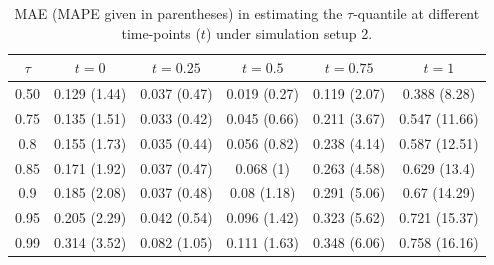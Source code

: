 \documentclass[aos]{imsart}
\theoremstyle{plain}
\theoremstyle{remark}
\begin{document}
\begin{table}[ht]
\centering
\caption{MAE (MAPE given in parentheses) in estimating the $\tau$-quantile at different time-points ($t$) under simulation setup 2.}
\label{tab:sim-S2-MAE}
\begin{tabular}{cccccc}
  \toprule
  $\tau$ & $t = 0$ & $t = 0.25$ & $t = 0.5$ & $t = 0.75$ & $t = 1$ \\ 
  \midrule
  0.50 &  0.129 (1.44) & 0.037 (0.47) & 0.019 (0.27) & 0.119 (2.07) & 0.388 (8.28) \\ 
  0.75 & 0.135 (1.51) & 0.033 (0.42) & 0.045 (0.66) & 0.211 (3.67) & 0.547 (11.66) \\ 
  0.8 & 0.155 (1.73) & 0.035 (0.44) & 0.056 (0.82) & 0.238 (4.14) & 0.587 (12.51) \\ 
  0.85 & 0.171 (1.92) & 0.037 (0.47) & 0.068 (1) & 0.263 (4.58) & 0.629 (13.4) \\ 
  0.9 & 0.185 (2.08) & 0.037 (0.48) & 0.08 (1.18) & 0.291 (5.06) & 0.67 (14.29) \\ 
  0.95 & 0.205 (2.29) & 0.042 (0.54) & 0.096 (1.42) & 0.323 (5.62) & 0.721 (15.37) \\ 
  0.99 & 0.314 (3.52) & 0.082 (1.05) & 0.111 (1.63) & 0.348 (6.06) & 0.758 (16.16) \\
   \bottomrule
\end{tabular}
\end{table}
\end{document}
